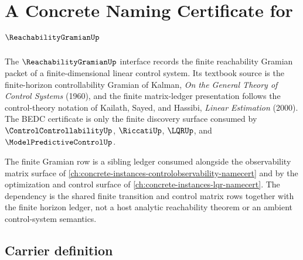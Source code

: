 \chapter{A Concrete Naming Certificate for $\ReachabilityGramianUp$}
\label{ch:concrete-instances-reachabilitygramian-namecert}

The $\ReachabilityGramianUp$ interface records the finite reachability Gramian packet of a finite-dimensional linear control system. Its textbook source is the finite-horizon controllability Gramian of Kalman, \emph{On the General Theory of Control Systems} (1960), and the finite matrix-ledger presentation follows the control-theory notation of Kailath, Sayed, and Hassibi, \emph{Linear Estimation} (2000). The BEDC certificate is only the finite discovery surface consumed by $\ControlControllabilityUp$, $\RiccatiUp$, $\LQRUp$, and $\ModelPredictiveControlUp$.

The finite Gramian row is a sibling ledger consumed alongside the observability matrix surface of \autoref{ch:concrete-instances-controlobservability-namecert} and by the optimization and control surface of \autoref{ch:concrete-instances-lqr-namecert}. The dependency is the shared finite transition and control matrix rows together with the finite horizon ledger, not a host analytic reachability theorem or an ambient control-system semantics.

\section{Carrier definition}
\label{sec:reachability-gramian-carrier}

